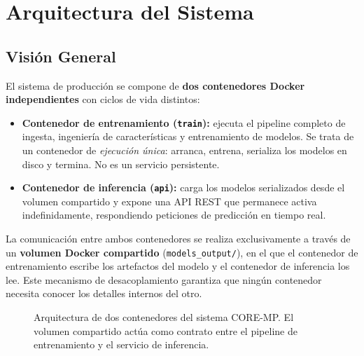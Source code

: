 \section{Arquitectura del Sistema}
\label{sec:arquitectura_despliegue}

\subsection{Visión General}
\label{subsec:vision_general}

El sistema de producción se compone de \textbf{dos contenedores Docker independientes} con ciclos de vida distintos:

\begin{itemize}
    \item \textbf{Contenedor de entrenamiento (\texttt{train}):} ejecuta el pipeline completo de ingesta, ingeniería de características y entrenamiento de modelos. Se trata de un contenedor de \textit{ejecución única}: arranca, entrena, serializa los modelos en disco y termina. No es un servicio persistente.
    \item \textbf{Contenedor de inferencia (\texttt{api}):} carga los modelos serializados desde el volumen compartido y expone una API REST que permanece activa indefinidamente, respondiendo peticiones de predicción en tiempo real.
\end{itemize}

La comunicación entre ambos contenedores se realiza exclusivamente a través de un \textbf{volumen Docker compartido} (\texttt{models\_output/}), en el que el contenedor de entrenamiento escribe los artefactos del modelo y el contenedor de inferencia los lee. Este mecanismo de desacoplamiento garantiza que ningún contenedor necesita conocer los detalles internos del otro.

\begin{figure}[H]
\centering
{}
\caption{Arquitectura de dos contenedores del sistema CORE-MP. El volumen compartido actúa como contrato entre el pipeline de entrenamiento y el servicio de inferencia.}
\label{fig:arquitectura_docker}
\end{figure}

